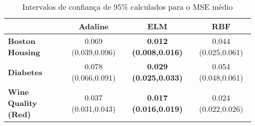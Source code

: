 \documentclass[conference]{IEEEtran}
\begin{document}
%	
%	

	
	\begin{table*}[thpbh]
		\caption{Intervalos de confiança de 95\% calculados para o MSE médio}
		\label{tab:regression}
		\centering
			\begin{tabular}{l|c|c|c|}
				\cline{2-4}
				& \textbf{Adaline} & \textbf{ELM}              & \textbf{RBF}     \\ \hline
				\multicolumn{1}{|l|}{\textbf{Boston Housing}} & 0.069 (0.039,0.096) & \textbf{0.012 (0.008,0.016)} & 0.044 (0.025,0.061) \\ \hline
				\multicolumn{1}{|l|}{\textbf{Diabetes}}       & 0.078 (0.066,0.091) & \textbf{0.029 (0.025,0.033)} & 0.054 (0.048,0.061) \\ \hline
				\multicolumn{1}{|l|}{\textbf{Wine Quality (Red)}}     & 0.037 (0.031,0.043) & \textbf{0.017 (0.016,0.019)} & 0.024 (0.022,0.026) \\ \hline
			\end{tabular}
	\end{table*}
\end{document}
